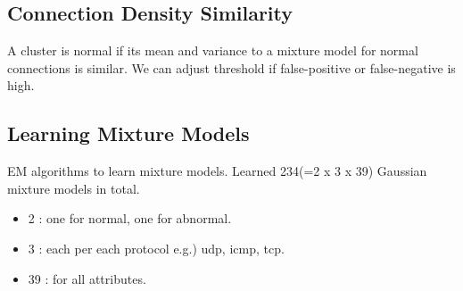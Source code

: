 \subsection{Connection Density Similarity}
\label{subsec:densitysimilarity}
A cluster is normal if its mean and variance to a mixture model for normal connections is similar. 
We can adjust threshold if false-positive or false-negative is high. 

\subsection{Learning Mixture Models}
\label{subsec:learningsimilarity}
EM algorithms to learn mixture models.
Learned 234(=2 x 3 x 39) Gaussian mixture models in total.
\begin{itemize}
\item 2 : one for normal, one for abnormal.
\item 3 : each per each protocol e.g.) udp, icmp, tcp.
\item 39 : for all attributes.
\end{itemize}

